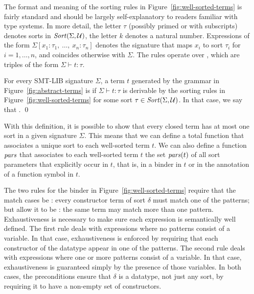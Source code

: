 The format and meaning of the sorting rules in Figure~\ref{fig:well-sorted-terms} 
is fairly standard and should be largely self-explanatory 
to readers familiar with type systems.
In more detail, the letter $\tau$ (possibly primed or with subscripts) 
denotes sorts in $\mathit{Sort}(\Sigma, \mathcal{U})$,
the letter $k$ denotes a natural number.
%
Expressions of the form $\Sigma[x_1:\tau_1,\: \ldots,\: x_n:\tau_n]$ 
denotes the signature 
that maps $x_i$ to sort $\tau_i$ for $i=1,\ldots,n$, and 
coincides otherwise with $\Sigma$.
The rules operate over ,
which are triples of the form $\Sigma \vdash t : \tau$.

\begin{definition}
For every SMT-LIB signature $\Sigma$,
a term $t$ generated by the grammar in Figure~\ref{fig:abstract-terms}
is 
if $\Sigma \vdash t : \tau$ is derivable 
by the sorting rules in Figure~\ref{fig:well-sorted-terms}
for some sort $\tau \in \mathit{Sort}(\Sigma,\mathcal{U})$.
In that case, 
we say that .
\qed
\end{definition}

With this definition, it is possible to show that every closed term has 
at most one sort in a given signature $\Sigma$.
This means that we can define a total function that associates a unique sort
to each well-sorted term $t$.
We can also define a function $\mathit{pars}$ that associates to each well-sorted term $t$ 
the set $\mathit{pars}(t)$ of all sort parameters that explicitly occur in $t$,
that is, in a binder in $t$ or in the annotation of a function symbol in $t$.

\begin{remark}
The two rules for the  binder in Figure~\ref{fig:well-sorted-terms} 
require that the match cases be :
every constructor term of sort $\delta$ must match one of the patterns;
but allow it to be :
the same term may match more than one pattern.
Exhaustiveness is necessary to make sure each  expression is
semantically well defined.
The first rule deals with  expressions where no patterns consist 
of a variable.
In that case, exhaustiveness is enforced by requiring that each constructor
of the datatype appear in one of the patterns.
The second rule deals with  expressions where one or more patterns 
consist of a variable.
In that case, exhaustiveness is guaranteed simply by the presence 
of those variables.
In both cases, the preconditions ensure that $\delta$ is a datatype, 
not just any sort, by requiring it to have a non-empty set of constructors.
\end{remark}

